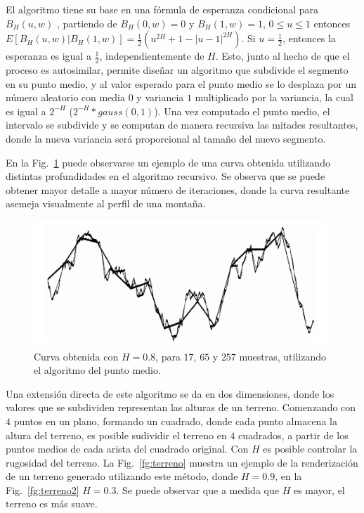 El algoritmo tiene su base en una fórmula de esperanza condicional para $B_{H}(u,w)$ \cite{Mandelbrot1968}, partiendo de $B_{H}(0,w) = 0$ y $B_{H}(1,w) = 1$, $0 \le u \le 1$ entonces $E[B_{H}(u,w)|B_{H}(1,w)] = \frac{1}{2} (u^{2H} + 1 - |u-1|^{2H})$.
Si $u=\frac{1}{2}$, entonces la esperanza es igual a $\frac{1}{2}$, independientemente de $H$.
Esto, junto al hecho de que el proceso es autosimilar, permite diseñar un algoritmo que subdivide el segmento en su punto medio, y al valor esperado para el punto medio se lo desplaza por un número aleatorio con media $0$ y variancia $1$ multiplicado por la variancia, la cual es igual a $2^{-H}$ ($2^{-H} * gauss(0,1) $).
Una vez computado el punto medio, el intervalo se subdivide y se computan de manera recursiva las mitades resultantes, donde la nueva variancia será proporcional al tamaño del nuevo segmento.

En la Fig.~\ref{fg:puntomedio} puede observarse un ejemplo de una curva obtenida utilizando distintas profundidades en el algoritmo recursivo.
Se observa que se puede obtener mayor detalle a mayor número de iteraciones, donde la curva resultante asemeja visualmente al perfil de una montaña.

\begin{figure}
\center
\includegraphics[width=11cm]{figures/puntomedio}
\caption[Curva obtenida utilizando el algoritmo del punto medio]{Curva obtenida con $H=0.8$, para $17$, $65$ y $257$ muestras, utilizando el algoritmo del punto medio.}
\label{fg:puntomedio}
\end{figure}


Una extensión directa de este algoritmo se da en dos dimensiones, donde los valores que se subdividen representan las alturas de un terreno.
Comenzando con $4$ puntos en un plano, formando un cuadrado, donde cada punto almacena la altura del terreno, es posible sudividir el terreno en $4$ cuadrados, a partir de los puntos medios de cada arista del cuadrado original.
Con $H$ es posible controlar la rugosidad del terreno.
La Fig.~\ref{fg:terreno} muestra un ejemplo de la renderización de un terreno generado utilizando este método, donde $H = 0.9$, en la Fig.~\ref{fg:terreno2} $H = 0.3$.
Se puede observar que a medida que $H$ es mayor, el terreno es más suave.

